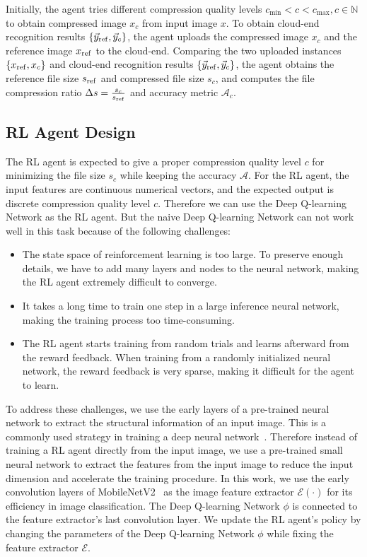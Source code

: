 Initially, the agent tries different compression quality levels $ c_{\min} < c < c_{\max}, c \in \mathbb{N} $ to obtain compressed image $ x_c $ from input image $ x $. To obtain cloud-end recognition results $ \{\vec{y}_{\rm ref}, \vec{y}_c\} $, the agent uploads the compressed image $ x_c $ and the reference image $ x_{\rm ref} $ to the cloud-end. Comparing the two uploaded instances $ \{x_{\rm ref}, x_c\} $ and cloud-end recognition results $ \{\vec{y}_{\rm ref}, \vec{y}_c\} $, the agent obtains the reference file size $ s_{\rm ref} $ and compressed file size $ s_c $, and computes the file compression ratio $ \Delta s = \frac{s_c}{s_{\rm ref}} $ and accuracy metric $ \mathcal{A}_c $.

\subsection{RL Agent Design}

The RL agent is expected to give a proper compression quality level $ c $ for minimizing the file size $ s_c $ while keeping the accuracy $ \mathcal{A} $. For the RL agent, the input features are continuous numerical vectors, and the expected output is discrete compression quality level $ c $. Therefore we can use the Deep Q-learning Network as the RL agent. But the naive Deep Q-learning Network can not work well in this task because of the following challenges: %

\begin{itemize}
	\item The state space of reinforcement learning is too large. To preserve enough details, we have to add many layers and nodes to the neural network, making the RL agent extremely difficult to converge. 
	\item It takes a long time to train one step in a large inference neural network, making the training process too time-consuming.
	\item The RL agent starts training from random trials and learns afterward from the reward feedback. When training from a randomly initialized neural network, the reward feedback is very sparse, making it difficult for the agent to learn.
\end{itemize}

To address these challenges, we use the early layers of a pre-trained neural network to extract the structural information of an input image. This is a commonly used strategy in training a deep neural network~\cite{finetunning,finetunning2}. Therefore instead of training a RL agent directly from the input image, we use a pre-trained small neural network to extract the features from the input image to reduce the input dimension and accelerate the training procedure. In this work, we use the early convolution layers of MobileNetV2~\cite{MobileNetV2} as the image feature extractor $ \mathcal{E}(\cdot) $ for its efficiency in image classification. The Deep Q-learning Network $ \phi $ is connected to the feature extractor's last convolution layer. We update the RL agent's policy by changing the parameters of the Deep Q-learning Network $ \phi $ while fixing the feature extractor $ \mathcal{E} $. %

